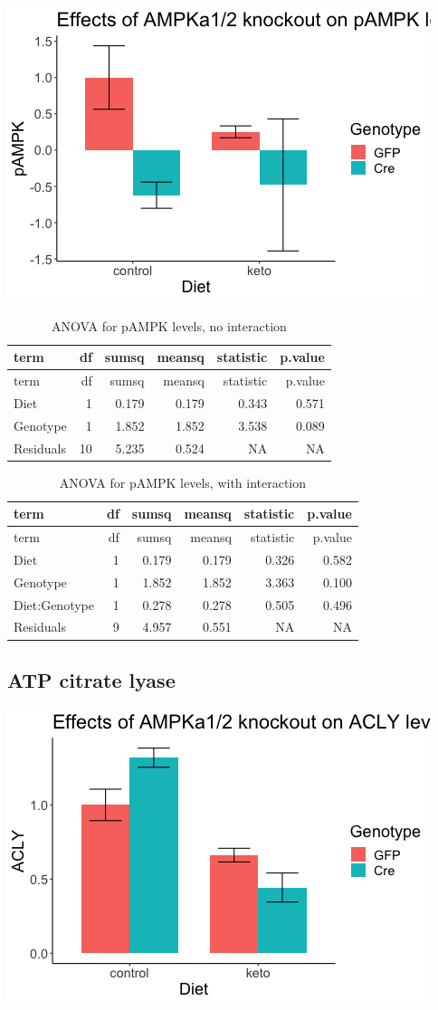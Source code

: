 \documentclass[
]{article}
\begin{document}
\includegraphics{figures/pAMPK-barplot-1.png}

\begin{longtable}[]{@{}lrrrrr@{}}
\caption{ANOVA for pAMPK levels, no interaction}\tabularnewline
\toprule
term & df & sumsq & meansq & statistic & p.value\tabularnewline
\midrule
\endfirsthead
\toprule
term & df & sumsq & meansq & statistic & p.value\tabularnewline
\midrule
\endhead
Diet & 1 & 0.179 & 0.179 & 0.343 & 0.571\tabularnewline
Genotype & 1 & 1.852 & 1.852 & 3.538 & 0.089\tabularnewline
Residuals & 10 & 5.235 & 0.524 & NA & NA\tabularnewline
\bottomrule
\end{longtable}

\begin{longtable}[]{@{}lrrrrr@{}}
\caption{ANOVA for pAMPK levels, with interaction}\tabularnewline
\toprule
term & df & sumsq & meansq & statistic & p.value\tabularnewline
\midrule
\endfirsthead
\toprule
term & df & sumsq & meansq & statistic & p.value\tabularnewline
\midrule
\endhead
Diet & 1 & 0.179 & 0.179 & 0.326 & 0.582\tabularnewline
Genotype & 1 & 1.852 & 1.852 & 3.363 & 0.100\tabularnewline
Diet:Genotype & 1 & 0.278 & 0.278 & 0.505 & 0.496\tabularnewline
Residuals & 9 & 4.957 & 0.551 & NA & NA\tabularnewline
\bottomrule
\end{longtable}

\hypertarget{atp-citrate-lyase}{%
\subsection{ATP citrate lyase}\label{atp-citrate-lyase}}

\includegraphics{figures/ACLY-barplot-1.png}
\end{document}
